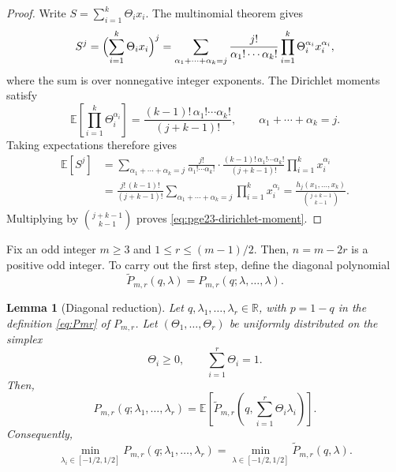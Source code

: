 \documentclass[11pt]{article}
\newtheorem{lemma}[theorem]{Lemma}
\theoremstyle{remark}
\numberwithin{equation}{section}
\newcommand{\R}{\mathbb R}
\newcommand{\E}{\mathbb E}
\begin{document}
\begin{proof}
  Write $S=\sum_{i=1}^k\Theta_i x_i$. The multinomial theorem gives
  \[
    S^j=\Bigl(\sum_{i=1}^k\Theta_i x_i\Bigr)^j
    =\sum_{\alpha_1+\cdots+\alpha_k=j}
    \frac{j!}{\alpha_1!\cdots\alpha_k!}
    \prod_{i=1}^k\Theta_i^{\alpha_i}x_i^{\alpha_i},
  \]
  where the sum is over nonnegative integer exponents.
  The Dirichlet moments satisfy
  \[
    \E\left[\prod_{i=1}^k\Theta_i^{\alpha_i}\right]
    =\frac{(k-1)!\,\alpha_1!\cdots\alpha_k!}{(j+k-1)!},
    \qquad \alpha_1+\cdots+\alpha_k=j.
  \]
  Taking expectations therefore gives
  \begin{align*}
    \E\left[S^j\right]
    &=\sum_{\alpha_1+\cdots+\alpha_k=j}
    \frac{j!}{\alpha_1!\cdots\alpha_k!}
    \cdot\frac{(k-1)!\,\alpha_1!\cdots\alpha_k!}{(j+k-1)!}
    \prod_{i=1}^k x_i^{\alpha_i}\\
    &=\frac{j!\,(k-1)!}{(j+k-1)!}
    \sum_{\alpha_1+\cdots+\alpha_k=j}\prod_{i=1}^k x_i^{\alpha_i}
    =\frac{h_j(x_1,\ldots,x_k)}{\binom{j+k-1}{k-1}}.
  \end{align*}
  Multiplying by $\binom{j+k-1}{k-1}$ proves
  \eqref{eq:pge23-dirichlet-moment}.
\end{proof}

Fix an odd integer $m\ge3$ and $1\le r\le(m-1)/2$. Then, $n=m-2r$ is a positive odd integer.
To carry out the first step, define the diagonal polynomial
\begin{equation}\label{eq:pge23-Ptilde}
  \widetilde P_{m,r}(q,\lambda)
  =P_{m,r}(q;\lambda,\ldots,\lambda).
\end{equation}

\begin{lemma}[Diagonal reduction]\label{lem:pge23-dirichlet}
  Let $q,\lambda_1,\ldots,\lambda_r\in\R$, with $p=1-q$ in
  the definition \eqref{eq:Pmr} of $P_{m,r}$.
  Let $(\Theta_1,\ldots,\Theta_r)$ be uniformly distributed on the simplex
  \[
    \Theta_i\ge0,\qquad \sum_{i=1}^r\Theta_i=1.
  \]
  Then,
  \begin{equation}\label{eq:pge23-dirichlet-identity}
    P_{m,r}(q;\lambda_1,\ldots,\lambda_r)
    =\E\left[\widetilde P_{m,r}
    \left(q,\sum_{i=1}^r\Theta_i\lambda_i\right)\right].
  \end{equation}
  Consequently,
  \begin{equation*}
    \min_{\lambda_i\in[-1/2,1/2]}
    P_{m,r}(q;\lambda_1,\ldots,\lambda_r)
    =\min_{\lambda\in[-1/2,1/2]}\widetilde P_{m,r}(q,\lambda).
  \end{equation*}
\end{lemma}
\end{document}

